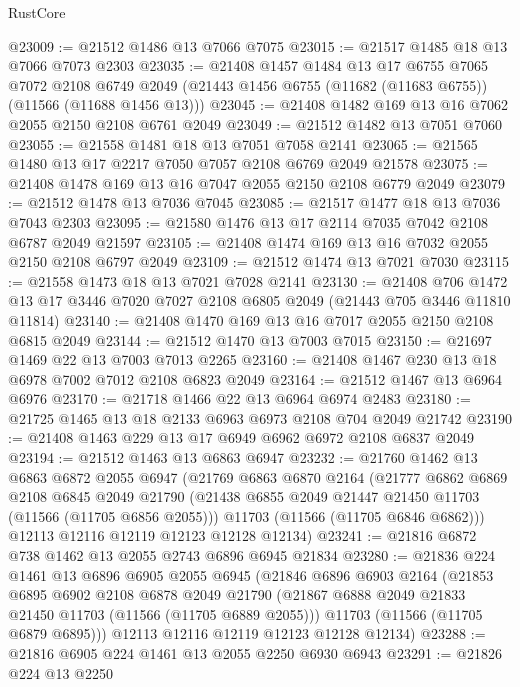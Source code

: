 \begin{lexlean}{RustCore}
\begin{coremodule}
@23009 := @21512 @1486 @13 @7066 @7075
@23015 := @21517 @1485 @18 @13 @7066 @7073 @2303
@23035 := @21408
    @1457
    @1484
    @13
    @17
    @6755
    @7065
    @7072
    @2108
    @6749
    @2049
    (@21443 @1456 @6755 (@11682 (@11683 @6755)) (@11566 (@11688 @1456 @13)))
@23045 := @21408 @1482 @169 @13 @16 @7062 @2055 @2150 @2108 @6761 @2049
@23049 := @21512 @1482 @13 @7051 @7060
@23055 := @21558 @1481 @18 @13 @7051 @7058 @2141
@23065 := @21565 @1480 @13 @17 @2217 @7050 @7057 @2108 @6769 @2049 @21578
@23075 := @21408 @1478 @169 @13 @16 @7047 @2055 @2150 @2108 @6779 @2049
@23079 := @21512 @1478 @13 @7036 @7045
@23085 := @21517 @1477 @18 @13 @7036 @7043 @2303
@23095 := @21580 @1476 @13 @17 @2114 @7035 @7042 @2108 @6787 @2049 @21597
@23105 := @21408 @1474 @169 @13 @16 @7032 @2055 @2150 @2108 @6797 @2049
@23109 := @21512 @1474 @13 @7021 @7030
@23115 := @21558 @1473 @18 @13 @7021 @7028 @2141
@23130 := @21408
    @706
    @1472
    @13
    @17
    @3446
    @7020
    @7027
    @2108
    @6805
    @2049
    (@21443 @705 @3446 @11810 @11814)
@23140 := @21408 @1470 @169 @13 @16 @7017 @2055 @2150 @2108 @6815 @2049
@23144 := @21512 @1470 @13 @7003 @7015
@23150 := @21697 @1469 @22 @13 @7003 @7013 @2265
@23160 := @21408 @1467 @230 @13 @18 @6978 @7002 @7012 @2108 @6823 @2049
@23164 := @21512 @1467 @13 @6964 @6976
@23170 := @21718 @1466 @22 @13 @6964 @6974 @2483
@23180 := @21725 @1465 @13 @18 @2133 @6963 @6973 @2108 @704 @2049 @21742
@23190 := @21408 @1463 @229 @13 @17 @6949 @6962 @6972 @2108 @6837 @2049
@23194 := @21512 @1463 @13 @6863 @6947
@23232 := @21760
    @1462
    @13
    @6863
    @6872
    @2055
    @6947
    (@21769
      @6863
      @6870
      @2164
      (@21777
        @6862
        @6869
        @2108
        @6845
        @2049
        @21790
        (@21438 @6855 @2049 @21447 @21450 @11703 (@11566 (@11705 @6856 @2055)))
        @11703
        (@11566 (@11705 @6846 @6862)))
      @12113
      @12116
      @12119
      @12123
      @12128
      @12134)
@23241 := @21816 @6872 @738 @1462 @13 @2055 @2743 @6896 @6945 @21834
@23280 := @21836
    @224
    @1461
    @13
    @6896
    @6905
    @2055
    @6945
    (@21846
      @6896
      @6903
      @2164
      (@21853
        @6895
        @6902
        @2108
        @6878
        @2049
        @21790
        (@21867 @6888 @2049 @21833 @21450 @11703 (@11566 (@11705 @6889 @2055)))
        @11703
        (@11566 (@11705 @6879 @6895)))
      @12113
      @12116
      @12119
      @12123
      @12128
      @12134)
@23288 := @21816 @6905 @224 @1461 @13 @2055 @2250 @6930 @6943
@23291 := @21826 @224 @13 @2250

\end{coremodule}
\end{lexlean}
